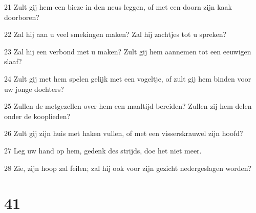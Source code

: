 \par 21 Zult gij hem een bieze in den neus leggen, of met een doorn zijn kaak doorboren?
\par 22 Zal hij aan u veel smekingen maken? Zal hij zachtjes tot u spreken?
\par 23 Zal hij een verbond met u maken? Zult gij hem aannemen tot een eeuwigen slaaf?
\par 24 Zult gij met hem spelen gelijk met een vogeltje, of zult gij hem binden voor uw jonge dochters?
\par 25 Zullen de metgezellen over hem een maaltijd bereiden? Zullen zij hem delen onder de kooplieden?
\par 26 Zult gij zijn huis met haken vullen, of met een visserskrauwel zijn hoofd?
\par 27 Leg uw hand op hem, gedenk des strijds, doe het niet meer.
\par 28 Zie, zijn hoop zal feilen; zal hij ook voor zijn gezicht nedergeslagen worden?

\chapter{41}

